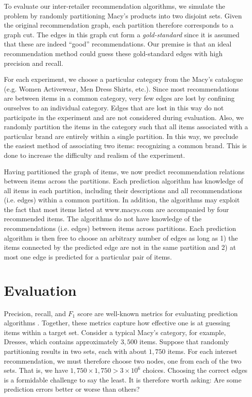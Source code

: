 \documentclass[11pt]{article}
\begin{document}
To evaluate our inter-retailer recommendation algorithms, we simulate the
problem by randomly partitioning Macy's products into two disjoint sets. Given
the original recommendation graph, each partition therefore corresponds to a
graph cut. The edges in this graph cut form a {\em gold-standard} since it is
assumed that these are indeed ``good'' recommendations. Our premise is that an
ideal recommendation method could guess these gold-standard edges with high
precision and recall.

For each experiment, we choose a particular category from the Macy's catalogue
(e.g. Women Activewear, Men Dress Shirts, etc.). Since most recommendations are
between items in a common category, very few edges are lost by confining
ourselves to an individual category. Edges that are lost in this way do not
participate in the experiment and are not considered during evaluation.  Also,
we randomly partition the items in the category such that all items associated
with a particular brand are entirely within a single partition. In this way, we
preclude the easiest method of associating two items: recognizing a common
brand. This is done to increase the difficulty and realism of the experiment.

Having partitioned the graph of items, we now predict recommendation relations
between items across the partitions. Each prediction algorithm has knowledge of
all items in each partition, including their descriptions and all
recommendations (i.e.  edges) within a common partition. In addition,
the algorithms may exploit the fact that most items listed at www.macys.com are
accompanied by four recommended items. The algorithms do not have knowledge of
the recommendations (i.e. edges) between items across partitions. Each
prediction algorithm is then free to choose an arbitrary number of edges as long
as 1) the items connected by the predicted edge are not in the same partition
and 2) at most one edge is predicted for a particular pair of items.

\section*{Evaluation}
Precision, recall, and $F_1$ score are well-known metrics for evaluating
prediction algorithms \cite{Powers2011}. Together, these metrics capture how
effective one is at guessing items within a target set. Consider a typical
Macy's category, for example, Dresses, which contains approximately $3,500$
items. Suppose that randomly partitioning results in two sets, each with about
$1,750$ items. For each interset recommendation, we must therefore choose two
nodes, one from each of the two sets. That is, we have $1,750 \times 1,750 > 3
\times 10^6$ choices. Choosing the correct edges is a formidable challenge to
say the least. It is therefore worth asking: Are some prediction errors better
or worse than others?
\end{document}
